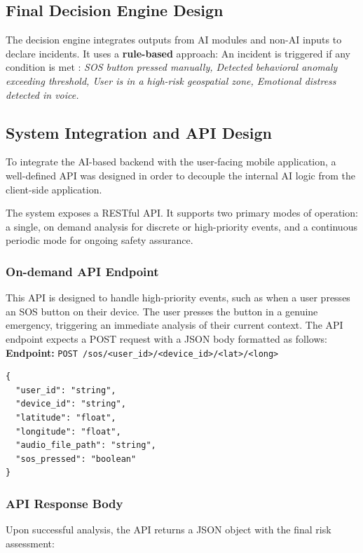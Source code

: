 \documentclass[12pt,a4paper,oneside,english]{book}
\begin{document}
{\subsection{Final Decision Engine Design}
The decision engine integrates outputs from AI modules and non-AI inputs to declare incidents. It uses a \textbf{rule-based} approach: 
An incident is triggered if any condition is met :
\textit{SOS button pressed manually, Detected behavioral anomaly exceeding threshold, User is in a high-risk geospatial zone, Emotional distress detected in voice.}

\subsection{System Integration and API Design}
To integrate the AI-based backend with the user-facing mobile application, 
a well-defined API was designed in order to decouple the internal AI logic from the client-side application.

The system exposes a RESTful API. It supports two primary modes of operation: a single, on demand analysis for
  discrete or high-priority events, and a continuous periodic mode for ongoing safety assurance.


\subsubsection{On-demand API Endpoint}
This API is designed to handle high-priority events, such as when a user presses an SOS button on their device.%
The user presses the button in a genuine emergency, triggering an immediate analysis of their current context.
The API endpoint expects a POST request with a JSON body formatted as follows:
\textbf{Endpoint:} \verb|POST /sos/<user_id>/<device_id>/<lat>/<long> |
\begin{lstlisting}[style=jsonstyle-compact]
{
  "user_id": "string",
  "device_id": "string",
  "latitude": "float",
  "longitude": "float",
  "audio_file_path": "string",
  "sos_pressed": "boolean"
}
\end{lstlisting}

\subsubsection{API Response Body}
Upon successful analysis, the API returns a JSON object with the final risk assessment:

}
\end{document}
